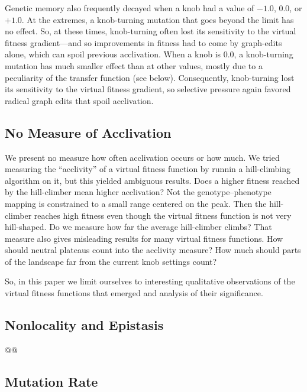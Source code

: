 \documentclass[letterpaper]{article}
\begin{document}
Genetic memory also frequently decayed when a knob had a value of $-1.0$,
$0.0$, or $+1.0$. At the extremes, a knob-turning mutation that goes beyond the
limit has no effect. So, at these times, knob-turning often lost its
sensitivity to the virtual fitness gradient---and so improvements in fitness
had to come by graph-edits alone, which can spoil previous acclivation. When a
knob is 0.0, a knob-turning mutation has much smaller effect than at other
values, mostly due to a peculiarity of the transfer function (see below).
Consequently, knob-turning lost its sensitivity to the virtual fitness
gradient, so selective pressure again favored radical graph edits that spoil
acclivation.

\subsection{No Measure of Acclivation}

We present no measure how often acclivation occurs or how much. We tried
measuring the ``acclivity'' of a virtual fitness function by runnin a
hill-climbing algorithm on it, but this yielded ambiguous results. Does a
higher fitness reached by the hill-climber mean higher acclivation? Not the
genotype--phenotype mapping is constrained to a small range centered on the
peak. Then the hill-climber reaches high fitness even though the virtual
fitness function is not very hill-shaped. Do we measure how far the average
hill-climber climbs?  That measure also gives misleading results for many
virtual fitness functions. How should neutral plateaus count into the acclivity
measure? How much should parts of the landscape far from the current knob
settings count?

So, in this paper we limit ourselves to interesting qualitative observations
of the virtual fitness functions that emerged and analysis of their
significance.

\subsection{Nonlocality and Epistasis}

@@

\subsection{Mutation Rate}
\end{document}
